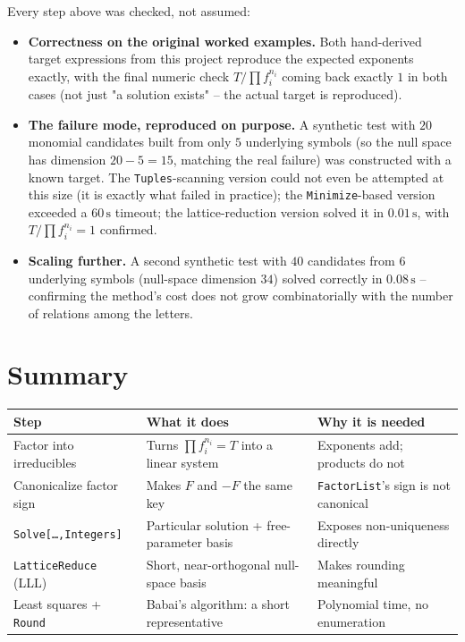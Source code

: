 \documentclass[11pt]{article}
\newcommand{\code}[1]{\texttt{#1}}
\begin{document}
Every step above was checked, not assumed:
\begin{itemize}
	\item \textbf{Correctness on the original worked examples.} Both hand-derived target expressions from this project reproduce the expected exponents exactly, with the final numeric check $T/\prod f_i^{n_i}$ coming back exactly $1$ in both cases (not just "a solution exists" -- the actual target is reproduced).
	\item \textbf{The failure mode, reproduced on purpose.} A synthetic test with $20$ monomial candidates built from only $5$ underlying symbols (so the null space has dimension $20-5=15$, matching the real failure) was constructed with a known target. The \code{Tuples}-scanning version could not even be attempted at this size (it is exactly what failed in practice); the \code{Minimize}-based version exceeded a $60\,\mathrm{s}$ timeout; the lattice-reduction version solved it in $0.01\,\mathrm{s}$, with $T/\prod f_i^{n_i}=1$ confirmed.
	\item \textbf{Scaling further.} A second synthetic test with $40$ candidates from $6$ underlying symbols (null-space dimension $34$) solved correctly in $0.08\,\mathrm{s}$ -- confirming the method's cost does not grow combinatorially with the number of relations among the letters.
\end{itemize}

\section{Summary}

\begin{table}[h]
\centering
\begin{tabular}{@{}lll@{}}
\toprule
Step & What it does & Why it is needed \\
\midrule
Factor into irreducibles & Turns $\prod f_i^{n_i}=T$ into a linear system & Exponents add; products do not \\
Canonicalize factor sign & Makes $F$ and $-F$ the same key & \code{FactorList}'s sign is not canonical \\
\code{Solve[\ldots,Integers]} & Particular solution + free-parameter basis & Exposes non-uniqueness directly \\
\code{LatticeReduce} (LLL) & Short, near-orthogonal null-space basis & Makes rounding meaningful \\
Least squares + \code{Round} & Babai's algorithm: a short representative & Polynomial time, no enumeration \\
\bottomrule
\end{tabular}
\end{table}
\end{document}
